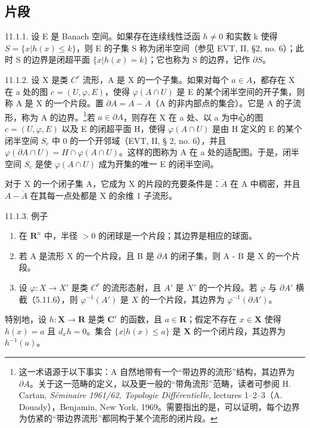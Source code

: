 \subsection{片段}

11.1.1. 设 E 是 Banach 空间。如果存在连续线性泛函 \(h \neq 0\) 和实数 k 使得 \(S = \{x|h(x) \leqslant k\}\)，则 E 的子集 S 称为闭半空间（参见 EVT, II, §2, no. 6）；此时 S 的边界是闭超平面 \(\{x|h(x) = k\}\)；它也称为 S 的边界，记作 \(\partial S\)。

11.1.2. 设 X 是类 \(C^{r}\) 流形，A 是 X 的一个子集。如果对每个 \(a \in A\)，都存在 X 在 a 处的图 \(c = (U, \varphi, E)\)，使得 \(\varphi(A \cap U)\) 是 E 的某个闭半空间的开子集，则称 A 是 X 的一个片段。置 \(\partial A = A - \mathring{A}\)（A 的非内部点的集合）。它是 A 的子流形，称为 A 的边界。\footnote{这一术语源于以下事实：A 自然地带有一个“带边界的流形”结构，其边界为 \(\partial A\)。关于这一范畴的定义，以及更一般的“带角流形”范畴，读者可参阅 H. Cartan, \emph{Séminaire 1961/62, Topologie Différentielle}, lectures 1–2–3（A. Douady），Benjamin, New York, 1969。需要指出的是，可以证明，每个边界为仿紧的“带边界流形”都同构于某个流形的闭片段。}若 \(a \in \partial A\)，则存在 X 在 a 处、以 a 为中心的图 \(c = (U, \varphi, E)\) 以及 E 的闭超平面 H，使得 \(\varphi(A \cap U)\) 是由 H 定义的 E 的某个闭半空间 \(S_{c}\) 中 0 的一个开邻域（EVT, II, § 2, no. 6），并且 \(\varphi(\partial A \cap U) = H \cap \varphi(A \cap U)\)。这样的图称为 A 在 a 处的适配图。于是，闭半空间 \(S_{c}\) 是使 \(\varphi(A \cap U)\) 成为开集的唯一 E 的闭半空间。

对于 X 的一个闭子集 A，它成为 X 的片段的充要条件是：\(\mathring{A}\) 在 A 中稠密，并且 \(A-\mathring{A}\) 在其每一点处都是 X 的余维 1 子流形。

11.1.3. 例子

\begin{enumerate}
\def\labelenumi{\alph{enumi})}
\item
  在 \(\mathbf{R}^{n}\) 中，半径 \(>0\) 的闭球是一个片段；其边界是相应的球面。
\item
  若 A 是流形 X 的一个片段，且 B 是 \(\partial A\) 的闭子集，则 A - B 是 X 的一个片段。
\item
  设 \(\varphi: X \to X'\) 是类 \(C^r\) 的流形态射，且 \(A'\) 是 \(X'\) 的一个片段。若 \(\varphi\) 与 \(\partial A'\) 横截（5.11.6），则 \(\varphi^{-1}(A')\) 是 \(X\) 的一个片段，其边界为 \(\varphi^{-1}(\partial A')\)。
\end{enumerate}

特别地，设 \(h: \mathbf{X} \to \mathbf{R}\) 是类 \(\mathbf{C}^r\) 的函数，且 \(a \in \mathbf{R}\)；假定不存在 \(x \in \mathbf{X}\) 使得 \(h(x) = a\) 且 \(d_x h = 0\)。集合 \(\{x | h(x) \leqslant a\}\) 是 \(\mathbf{X}\) 的一个闭片段，其边界为 \(h^{-1}(a)\)。

